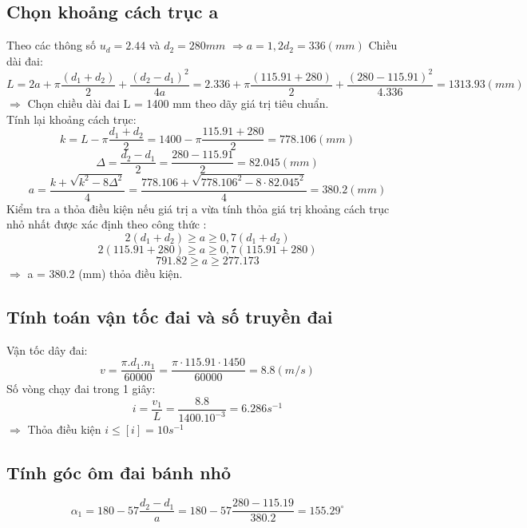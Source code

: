 \subsection{Chọn khoảng cách trục a}
Theo các thông số $u_d = 2.44$ và $d_2 = 280mm$ $\Rightarrow a = 1,2d_2 = 336 (mm)$ 
Chiều dài đai: \\
\[
    L = 2a + \pi\frac{(d_1 + d_2)}{2} + \frac{(d_2 - d_1)^2}{4a} = 2.336 + \pi\frac{(115.91 + 280)}{2} + \frac{(280 - 115.91)^2}{4.336} = 1313.93 (mm)
\]
$\Rightarrow$ Chọn chiều dài đai L = 1400 mm theo dãy giá trị tiêu chuẩn. \\
Tính lại khoảng cách trục: 
\[
    k = L - \pi\frac{d_1 + d_2}{2} = 1400 - \pi\frac{115.91 + 280}{2} =778.106 (mm)
\]
\[
    \Delta = \frac{d_2 - d_1}{2} = \frac{280 - 115.91}{2} = 82.045 (mm)
\]
\[
    a = \frac{k + \sqrt{k^2 - 8\Delta^2}}{4} = \frac{778.106 + \sqrt{778.106^2 - 8\cdot82.045^2}}{4} = 380.2 (mm)
\]
Kiểm tra a thỏa điều kiện nếu giá trị a vừa tính thỏa giá trị khoảng cách trục nhỏ
nhất được xác định theo công thức : \\
\[
    2(d_1+d_2) \geq a \geq 0,7(d_1+d_2)
\]
\[
    2(115.91+280) \geq a \geq 0,7(115.91+280)
\]
\[
    791.82 \geq a \geq 277.173
\]
$\Rightarrow$ a = 380.2 (mm) thỏa điều kiện. \\
\cleardoublepage
\subsection{Tính toán vận tốc đai và số truyền đai}
Vận tốc dây đai: \\
\[
    v = \frac{\pi.d_1.n_1}{60000} = \frac{\pi \cdot 115.91 \cdot 1450}{60000} = 8.8 (m/s)
\]
Số vòng chạy đai trong 1 giây: \\
\[
    i = \frac{v_1}{L} = \frac{8.8}{1400.10^{-3}} = 6.286s^{-1} 
\]
$\Rightarrow$ Thỏa điều kiện $i \leq [i] = 10s^{-1}$ \\
\subsection{Tính góc ôm đai bánh nhỏ}
\[
    \alpha_1 = 180 - 57\frac{d_2 - d_1}{a} = 180 - 57\frac{280 - 115.19}{380.2} = 155.29^{\circ}
\]
